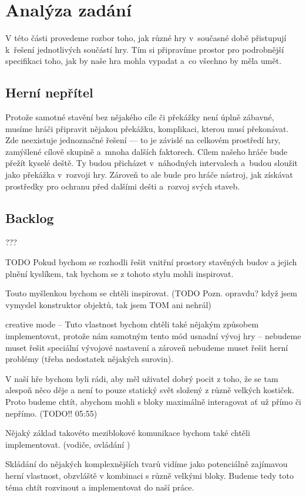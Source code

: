 
\chapter{Analýza zadání}
\label{chap:analyza}

V této části provedeme rozbor toho, jak různé hry v~současné době přistupují k~řešení jednotlivých součástí hry. Tím si připravíme prostor pro podrobnější specifikaci toho, jak by naše hra mohla vypadat a~co všechno by měla umět.









\section{Herní nepřítel}
Protože samotné stavění bez nějakého cíle či překážky není úplně zábavné, musíme hráči připravit nějakou překážku, komplikaci, kterou musí překonávat. Zde neexistuje jednoznačné řešení --- to je závislé na celkovém prostředí hry, zamýšlené cílově skupině a~mnoha dalších faktorech. Cílem našeho hráče bude přežít kyselé deště. Ty budou přicházet v~náhodných intervalech a~budou sloužit jako překážka v~rozvoji hry. Zároveň to ale bude pro hráče nástroj, jak získávat prostředky pro ochranu před dalšími dešti a~rozvoj svých staveb. 

\section{Backlog}


???






TODO Pokud bychom se rozhodli řešit vnitřní prostory stavěných budov a jejich plnění kyslíkem, tak bychom se z tohoto stylu mohli inspirovat.

Touto myšlenkou bychom se chtěli inspirovat.  (TODO Pozn. opravdu? když jsem vymyslel konstruktor objektů, tak jsem TOM ani nehrál)



creative mode -- Tuto vlastnost bychom chtěli také nějakým způsobem implementovat, protože nám samotným tento mód usnadní vývoj hry -- nebudeme muset řešit speciální vývojové nastavení a zároveň nebudeme muset řešit herní problémy (třeba nedostatek nějakých surovin). 



V naší hře bychom byli rádi, aby měl uživatel dobrý pocit z toho, že se tam alespoň něco děje a není to pouze statický svět složený z různě velkých kostiček. Proto budeme chtít, abychom mohli s bloky maximálně interagovat ať už přímo či nepřímo. (TODO!! 05:55)


Nějaký základ takovéto meziblokové komunikace bychom také chtěli implementovat. (vodiče, ovládání )



Skládání do nějakých komplexnějších tvarů vidíme jako potenciálně zajímavou herní vlastnost, obzvláště v kombinaci s různě velkými bloky. Budeme tedy toto téma chtít rozvinout a implementovat do naší práce. 
